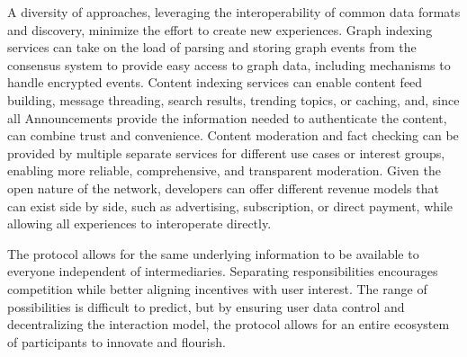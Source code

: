 \documentclass[12pt,letterpaper]{article}
\begin{document}
A diversity of approaches, leveraging the interoperability of common data formats and
discovery, minimize the effort to create new experiences. Graph indexing services can take
on the load of parsing and storing graph events from the consensus system to provide easy
access to graph data, including mechanisms to handle encrypted events. Content indexing
services can enable content feed building, message threading, search results, trending
topics, or caching, and, since all Announcements provide the information needed to
authenticate the content, can combine trust and convenience. Content moderation and fact
checking can be provided by multiple separate services for different use cases or interest
groups, enabling more reliable, comprehensive, and transparent moderation. Given the open
nature of the network, developers can offer different revenue models that can exist side by
side, such as advertising, subscription, or direct payment, while allowing all experiences
to interoperate directly.

The protocol allows for the same underlying information to be available to everyone
independent of intermediaries. Separating responsibilities encourages competition while
better aligning incentives with user interest. The range of possibilities is difficult to
predict, but by ensuring user data control and decentralizing the interaction model, the
protocol allows for an entire ecosystem of participants to innovate and flourish.

\nocite{0xwhitepaper}
\nocite{al-dahhan2019}
\nocite{al-dahhan2019}
\nocite{ateniese2006a}
\nocite{bünz2020}
\nocite{cheng2020}
\nocite{diebold2017}
\nocite{eip1078}
\nocite{eip173}
\nocite{eip712}
\nocite{ethereumyellow}
\nocite{ge2019}
\nocite{gnosissafe}
\nocite{green2018}
\nocite{henry2018}
\nocite{json-web-encryption}
\nocite{nacl}
\nocite{nakamoto}
\nocite{omara2020}
\nocite{openzeppelin}
\nocite{pirk}
\nocite{raikwar2019}
\nocite{swarm}
\nocite{ugander2011}
\nocite{unilogin}
\nocite{whisper}
\nocite{williams2019}

\printbibliography
\end{document}
